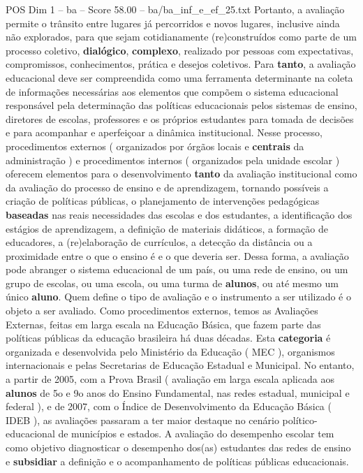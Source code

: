 \begin{textsample}{POS Dim 1 – ba – Score 58.00 – ba/ba\_inf\_e\_ef\_25.txt}
Portanto, a avaliação permite o trânsito entre lugares já percorridos e novos lugares, inclusive ainda não explorados, para que sejam cotidianamente (re)construídos como parte de um processo coletivo, \textbf{dialógico}, \textbf{complexo}, realizado por pessoas com expectativas, compromissos, conhecimentos, prática e desejos coletivos.
Para \textbf{tanto}, a avaliação educacional deve ser compreendida como uma ferramenta determinante na coleta de informações necessárias aos elementos que compõem o sistema educacional responsável pela determinação das políticas educacionais pelos sistemas de ensino, diretores de escolas, professores e os próprios estudantes para tomada de decisões e para acompanhar e aperfeiçoar a dinâmica institucional.
Nesse processo, procedimentos externos ( organizados por órgãos locais e \textbf{centrais} da administração ) e procedimentos internos ( organizados pela unidade escolar ) oferecem elementos para o desenvolvimento \textbf{tanto} da avaliação institucional como da avaliação do processo de ensino e de aprendizagem, tornando possíveis a criação de políticas públicas, o planejamento de intervenções pedagógicas \textbf{baseadas} nas reais necessidades das escolas e dos estudantes, a identificação dos estágios de aprendizagem, a definição de materiais didáticos, a formação de educadores, a (re)elaboração de currículos, a detecção da distância ou a proximidade entre o que o ensino é e o que deveria ser.
Dessa forma, a avaliação pode abranger o sistema educacional de um país, ou uma rede de ensino, ou um grupo de escolas, ou uma escola, ou uma turma de \textbf{alunos}, ou até mesmo um único \textbf{aluno}.
Quem define o tipo de avaliação e o instrumento a ser utilizado é o objeto a ser avaliado.
Como procedimentos externos, temos as Avaliações Externas, feitas em larga escala na Educação Básica, que fazem parte das políticas públicas da educação brasileira há duas décadas.
Esta \textbf{categoria} é organizada e desenvolvida pelo Ministério da Educação ( MEC ), organismos internacionais e pelas Secretarias de Educação Estadual e Municipal.
No entanto, a partir de 2005, com a Prova Brasil ( avaliação em larga escala aplicada aos \textbf{alunos} de 5o e 9o anos do Ensino Fundamental, nas redes estadual, municipal e federal ), e de 2007, com o Índice de Desenvolvimento da Educação Básica ( IDEB ), as avaliações passaram a ter maior destaque no cenário político-educacional de municípios e estados.
A avaliação do desempenho escolar tem como objetivo diagnosticar o desempenho dos(as) estudantes das redes de ensino e \textbf{subsidiar} a definição e o acompanhamento de políticas públicas educacionais.

\end{textsample}
